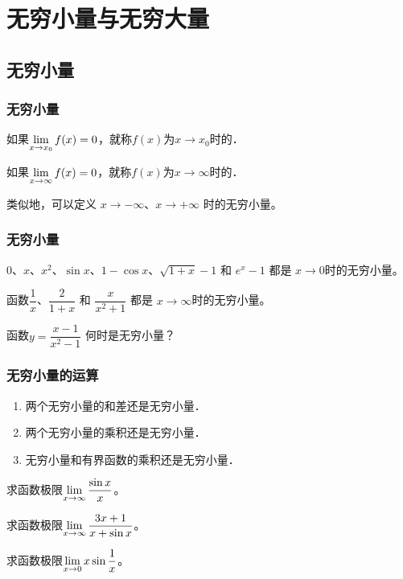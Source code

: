 \documentclass[14pt,notheorems,leqno,xcolor={rgb}]{beamer} %
\begin{document}
\section{无穷小量与无穷大量}

\subsection{无穷小量}

\begin{frame}
\frametitle{无穷小量}
\begin{definition*}
如果$\lim\limits_{x\to x_0}f(x)=0$，就称$f(x)$为$x\to x_0$时的．
\end{definition*}
\vpause
\begin{definition*}
如果$\lim\limits_{x\to\infty}f(x)=0$，就称$f(x)$为$x\to\infty$时的．
\end{definition*}
\vpause
\begin{remark*}
类似地，可以定义 $x\to-\infty$、$x\to+\infty$
时的无穷小量。
\end{remark*}
\end{frame}

\begin{frame}
\frametitle{无穷小量}
\begin{example}
$0$、$x$、$x^2$、$\sin x$、$1-\cos x$、$\sqrt{1+x}-1$ 和 $e^x-1$ 都是 $x\to0$时的无穷小量。
\end{example}
\vpause
\begin{example}
函数$\dfrac1x$、$\dfrac2{1+x}$ 和 $\dfrac{x}{x^2+1}$ 都是 $x\to\infty$时的无穷小量。
\end{example}
\vpause
\begin{example}
函数$y=\dfrac{x-1}{x^2-1}$ 何时是无穷小量？
\end{example}
\end{frame}

\begin{frame}
\frametitle{无穷小量的运算}
\begin{enumerate}
  \item 两个无穷小量的和差还是无穷小量．
  \item 两个无穷小量的乘积还是无穷小量．
  \item 无穷小量和有界函数的乘积还是无穷小量．
\end{enumerate}
\pause
\begin{example}
求函数极限$\lim\limits_{x\to\infty}\dfrac{\sin x}{x}$。
\end{example}
\pause
\begin{example}
求函数极限$\lim\limits_{x\to\infty}\dfrac{3x+1}{x+\sin x}$。
\end{example}
\pause
\begin{example}
求函数极限$\lim\limits_{x\to0}x\sin\dfrac{1}{x}$。
\end{example}
\end{frame}
\end{document}
